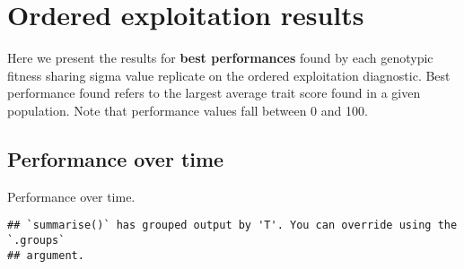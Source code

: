 \documentclass[]{book}
\newenvironment{Shaded}{\begin{snugshade}}{\end{snugshade}}
\newcommand{\DataTypeTok}[1]{\textcolor[rgb]{0.13,0.29,0.53}{#1}}
\newcommand{\KeywordTok}[1]{\textcolor[rgb]{0.13,0.29,0.53}{\textbf{#1}}}
\newcommand{\NormalTok}[1]{#1}
\newcommand{\OperatorTok}[1]{\textcolor[rgb]{0.81,0.36,0.00}{\textbf{#1}}}
\newcommand{\StringTok}[1]{\textcolor[rgb]{0.31,0.60,0.02}{#1}}
\begin{document}
\hypertarget{ordered-exploitation-results-1}{%
\section{Ordered exploitation results}\label{ordered-exploitation-results-1}}

Here we present the results for \textbf{best performances} found by each genotypic fitness sharing sigma value replicate on the ordered exploitation diagnostic.
Best performance found refers to the largest average trait score found in a given population.
Note that performance values fall between 0 and 100.

\hypertarget{performance-over-time-3}{%
\subsection{Performance over time}\label{performance-over-time-3}}

Performance over time.

\begin{Shaded}
\end{Shaded}

\begin{verbatim}
## `summarise()` has grouped output by 'T'. You can override using the `.groups`
## argument.
\end{verbatim}
\end{document}
